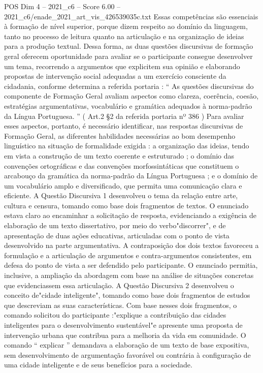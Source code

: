 \begin{textsample}{POS Dim 4 – 2021\_c6 – Score 6.00 – 2021\_c6/enade\_2021\_art\_vis\_426539035c.txt}
Essas competências são essenciais à formação de nível superior, porque dizem respeito ao domínio da linguagem, tanto no processo de leitura quanto na articulação e na organização de ideias para a produção textual.
Dessa forma, as duas questões discursivas de formação geral oferecem oportunidade para avaliar se o participante consegue desenvolver um tema, recorrendo a argumentos que explicitem sua opinião e elaborando propostas de intervenção social adequadas a um exercício consciente da cidadania, conforme determina a referida portaria : “ As questões discursivas do componente de Formação Geral avaliam aspectos como clareza, coerência, coesão, estratégias argumentativas, vocabulário e gramática adequados à norma-padrão da Língua Portuguesa. ” ( Art.2 §2 da referida portaria nº 386 ) Para avaliar esses aspectos, portanto, é necessário identificar, nas respostas discursivas de Formação Geral, as diferentes habilidades necessárias ao bom desempenho linguístico na situação de formalidade exigida : a organização das ideias, tendo em vista a construção de um texto coerente e estruturado ; o domínio das convenções ortográficas e das convenções morfossintáticas que constituem o arcabouço da gramática da norma-padrão da Língua Portuguesa ; e o domínio de um vocabulário amplo e diversificado, que permita uma comunicação clara e eficiente.
A Questão Discursiva 1 desenvolveu o tema da relação entre arte, cultura e censura, tomando como base dois fragmentos de textos.
O enunciado estava claro ao encaminhar a solicitação de resposta, evidenciando a exigência de elaboração de um texto dissertativo, por meio do verbo"discorrer", e de apresentação de duas ações educativas, articuladas com o ponto de vista desenvolvido na parte argumentativa.
A contraposição dos dois textos favoreceu a formulação e a articulação de argumentos e contra-argumentos consistentes, em defesa do ponto de vista a ser defendido pelo participante.
O enunciado permitia, inclusive, a ampliação da abordagem com base na análise de situações concretas que evidenciassem essa articulação.
A Questão Discursiva 2 desenvolveu o conceito de"cidade inteligente", tomando como base dois fragmentos de estudos que descreviam as suas características.
Com base nesses dois fragmentos, o comando solicitou do participante :"explique a contribuição das cidades inteligentes para o desenvolvimento sustentável"e apresente uma proposta de intervenção urbana que contribua para a melhoria da vida em comunidade.
O comando “ explicar ” demandava a elaboração de um texto de base expositiva, sem desenvolvimento de argumentação favorável ou contrária à configuração de uma cidade inteligente e de seus benefícios para a sociedade.

\end{textsample}
